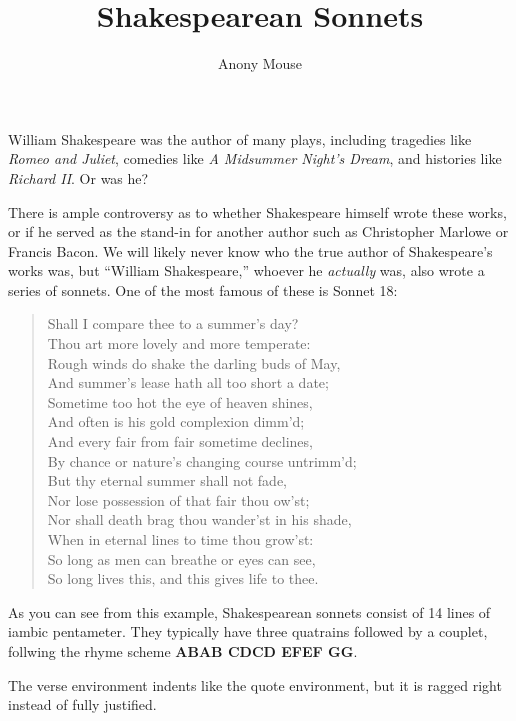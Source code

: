 \documentclass{article}
\title{Shakespearean Sonnets}
\author{Anony Mouse}
\date{}
\begin{document}
\maketitle

William Shakespeare was the author of many plays, including tragedies like \textit{Romeo and Juliet}, comedies like \textit{A Midsummer Night's Dream}, and histories like \textit{Richard II}. Or was he? 

There is ample controversy as to whether Shakespeare himself wrote these works, or if he served as the stand-in for another author such as Christopher Marlowe or Francis Bacon. We will likely never know who the true author of Shakespeare's works was, but ``William Shakespeare,'' whoever he \textit{actually} was, also wrote a series of sonnets. One of the most famous of these is Sonnet 18:

\begin{verse}

Shall I compare thee to a summer’s day? \\
Thou art more lovely and more temperate: \\
Rough winds do shake the darling buds of May, \\
And summer’s lease hath all too short a date; \\
Sometime too hot the eye of heaven shines, \\
And often is his gold complexion dimm'd; \\
And every fair from fair sometime declines, \\
By chance or nature’s changing course untrimm'd; \\
But thy eternal summer shall not fade, \\
Nor lose possession of that fair thou ow’st; \\
Nor shall death brag thou wander’st in his shade, \\
When in eternal lines to time thou grow’st:  \\
So long as men can breathe or eyes can see, \\
So long lives this, and this gives life to thee. \\

\end{verse} 

As you can see from this example, Shakespearean sonnets consist of 14 lines of iambic pentameter. They typically have three quatrains followed by a couplet, follwing the rhyme scheme \textbf{ABAB CDCD EFEF GG}. 

The verse environment indents like the quote environment, but it is ragged right instead of fully justified.
\end{document}
